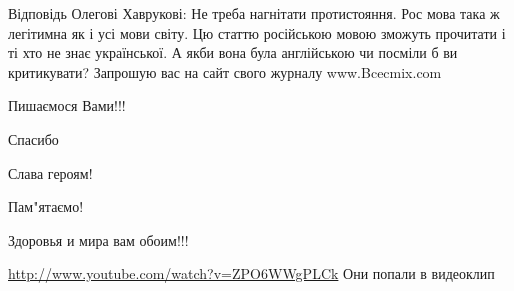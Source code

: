  
 
 
 
 


Відповідь Олегові Хаврукові: Не треба нагнітати протистояння. Рос мова така ж
легітимна як і усі мови світу. Цю статтю російською мовою зможуть прочитати і
ті хто не знає української. А якби вона була англійською чи посміли б ви
критикувати?  Запрошую вас на сайт свого журналу www.Bcecmix.com

Пишаємося Вами!!!

Спасибо

Слава героям!

Пам"ятаємо!

Здоровья и мира вам обоим!!!

\url{http://www.youtube.com/watch?v=ZPO6WWgPLCk} Они попали в видеоклип
